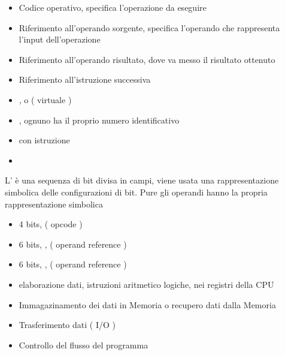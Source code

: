 \documentclass[arch.tex]{subfiles}
\begin{document}
%
\label{ppar:Elementi Istruzioni Macchina}


\begin{itemize}
	\item Codice operativo, specifica l'operazione da eseguire
	\item Riferimento all'operando sorgente, specifica l'operando che 
		rappresenta l'input dell'operazione
	\item Riferimento all'operando risultato, dove va messo
		il risultato ottenuto
	\item Riferimento all'istruzione successiva
\end{itemize}

%
\label{ppar:Locazione operandi}


\begin{itemize}
	\item {}, o ( virtuale ) 
	\item {}, ognuno ha il proprio numero identificativo
	\item {} con istruzione
	\item {}
\end{itemize}
L' è una sequenza di bit divisa in campi, viene usata una 
rappresentazione simbolica delle configurazioni di bit. Pure gli operandi
hanno la propria rappresentazione simbolica

%
\label{ppar:Formato Istruzione di 16 bit}


\begin{itemize}
	\item 4 bits,  ( opcode ) 
	\item 6 bits, , ( operand reference )
	\item 6 bits, , ( operand reference ) 
\end{itemize}

%
\label{ppar:Tipi di istruzioni}


\begin{itemize}
	\item elaborazione dati, istruzioni aritmetico logiche, nei registri della
		CPU
	\item Immagazinamento dei dati in Memoria o recupero dati dalla Memoria
	\item Trasferimento dati ( I/O ) 
	\item Controllo del flusso del programma		
\end{itemize}
\end{document}
